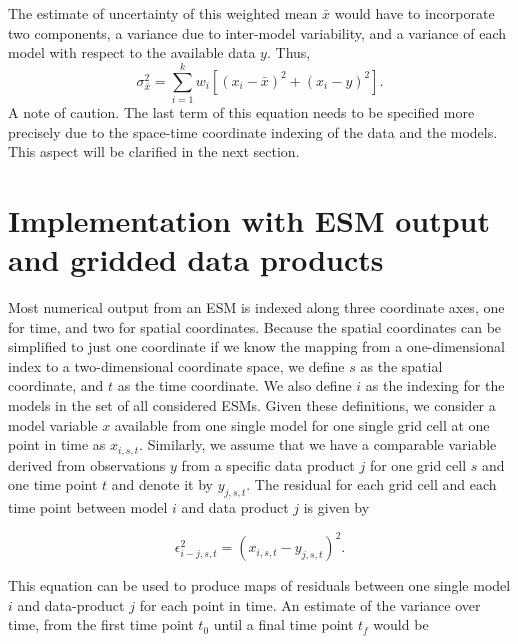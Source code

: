 \documentclass[gmd, manuscript]{copernicus}
\begin{document}
The estimate of uncertainty of this weighted mean $\bar{x}$ would have to incorporate two components, a variance due to inter-model variability, and a variance of each model with respect to the available data $y$. Thus,
\begin{equation}
\sigma_{\bar{x}}^2 =  \sum_{i=1}^k w_i \left[ (x_i -\bar{x})^2 + (x_i - y)^2 \right] .
\end{equation}
A note of caution. The last term of this equation needs to be specified more precisely due to the space-time coordinate indexing of the data and the models. This aspect will be clarified in the next section. 

\section{Implementation with ESM output and gridded data products}
Most numerical output from an ESM is indexed along three coordinate axes, one for time, and two for spatial coordinates. Because the spatial coordinates can be simplified to just one coordinate if we know the mapping from a one-dimensional index to a two-dimensional coordinate space, we define $s$ as the spatial coordinate, and $t$ as the time coordinate. We also define $i$ as the indexing for the models in the set of all considered ESMs. Given these definitions, we consider a model variable $x$ available from one single model for one single grid cell at one point in time as $x_{i, s, t}$. Similarly, we assume that we have a comparable variable derived from observations $y$ from a specific data product $j$ for one grid cell $s$ and one time point $t$ and denote it by $y_{j, s, t}$. The residual for each grid cell and each time point between model $i$ and data product $j$ is given by

\begin{equation}
\epsilon_{i-j, s, t}^2 =  (x_{i, s, t} - y_{j, s, t})^2.
\end{equation}

This equation can be used to produce maps of residuals between one single model $i$ and data-product $j$ for each point in time. An estimate of the variance over time, from the first time point $t_0$ until a final time point $t_f$ would be
\end{document}
